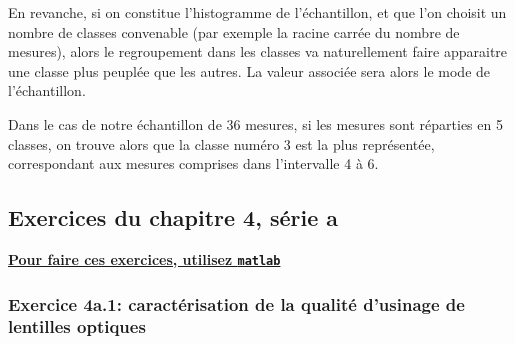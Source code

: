 \documentclass[main.tex]{subfiles}
\begin{document}
En revanche, si on constitue l'histogramme de l'échantillon, et que l'on choisit un nombre de classes convenable (par exemple la racine carrée du nombre de mesures), alors le regroupement dans les classes va naturellement faire apparaitre une classe plus peuplée que les autres. La valeur associée sera alors le mode de l'échantillon.

Dans le cas de notre échantillon de 36 mesures, si les mesures sont réparties en 5 classes, on trouve alors que la classe numéro 3 est la plus représentée, correspondant aux mesures comprises dans l'intervalle 4 à 6.

\fi
\iftrue

\newpage


\subsection{Exercices du chapitre 4, série a}


\begin{center}
    \Large \bf {\underline{Pour faire ces exercices, utilisez \texttt{matlab}}}
\end{center}

\subsubsection*{Exercice 4a.1: caractérisation de la qualité d'usinage de lentilles optiques}
\end{document}
